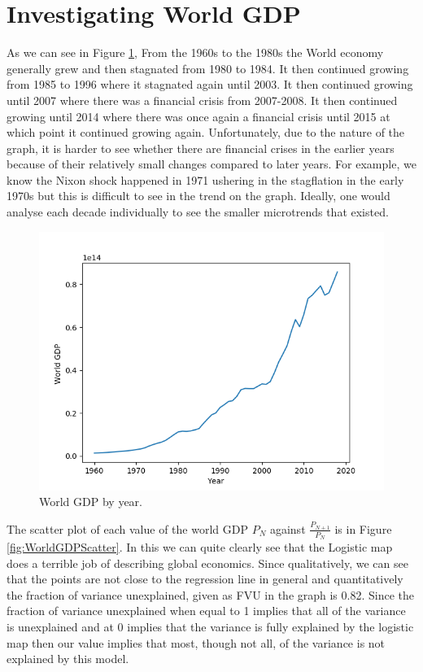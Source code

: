 \documentclass[11pt,a4paper]{CLabBookTemplate} %
\begin{document}
\section{Investigating World GDP}
As we can see in Figure \ref{fig:WorldGDP}, From the 1960s to the 1980s the World economy generally grew and then stagnated from 1980 to 1984. It then continued growing from 1985 to 1996 where it stagnated again until 2003. It then continued growing until 2007 where there was a financial crisis from 2007-2008. It then continued growing until 2014 where there was once again a financial crisis until 2015 at which point it continued growing again. Unfortunately, due to the nature of the graph, it is harder to see whether there are financial crises in the earlier years because of their relatively small changes compared to later years. For example, we know the Nixon shock happened in 1971 ushering in the stagflation in the early 1970s but this is difficult to see in the trend on the graph. Ideally, one would analyse each decade individually to see the smaller microtrends that existed. 

\begin{figure}[h!]
	\centering
	\includegraphics[width = 120mm]{Figures/WorldGDP.png}
	\caption{World GDP by year.}
	\label{fig:WorldGDP}
\end{figure}

The scatter plot of each value of the world GDP $P_{N}$ against $\frac{P_{N+1}}{P_{N}}$ is in Figure \ref{fig:WorldGDPScatter}. In this we can quite clearly see that the Logistic map does a terrible job of describing global economics. Since qualitatively, we can see that the points are not close to the regression line in general and quantitatively the fraction of variance unexplained, given as FVU in the graph is 0.82. Since the fraction of variance unexplained when equal to 1 implies that all of the variance is unexplained and at 0 implies that the variance is fully explained by the logistic map then our value implies that most, though not all, of the variance is not explained by this model. 
\end{document}
